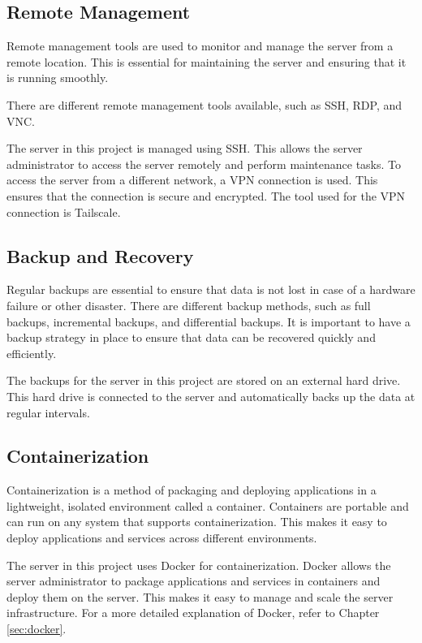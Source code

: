 \cite{networking}

\subsection{Remote Management}

Remote management tools are used to monitor and manage the server from a remote location.
This is essential for maintaining the server and ensuring that it is running smoothly.

There are different remote management tools available, such as SSH, RDP, and VNC. 

The server in this project is managed using SSH. This allows the server administrator to access the server remotely and perform maintenance tasks.
To access the server from a different network, a VPN connection is used. This ensures that the connection is secure and encrypted.
The tool used for the VPN connection is Tailscale.

\cite{remote_management}


\subsection{Backup and Recovery}

Regular backups are essential to ensure that data is not lost in case of a hardware failure or other disaster.
There are different backup methods, such as full backups, incremental backups, and differential backups.
It is important to have a backup strategy in place to ensure that data can be recovered quickly and efficiently.

The backups for the server in this project are stored on an external hard drive. This hard drive is connected to the server and automatically backs up the data at regular intervals.

\subsection{Containerization}

Containerization is a method of packaging and deploying applications in a lightweight, isolated environment called a container.
Containers are portable and can run on any system that supports containerization.
This makes it easy to deploy applications and services across different environments.

The server in this project uses Docker for containerization. Docker allows the server administrator to package applications and services in containers and deploy them on the server.
This makes it easy to manage and scale the server infrastructure. For a more detailed explanation of Docker, refer to Chapter \ref{sec:docker}.

